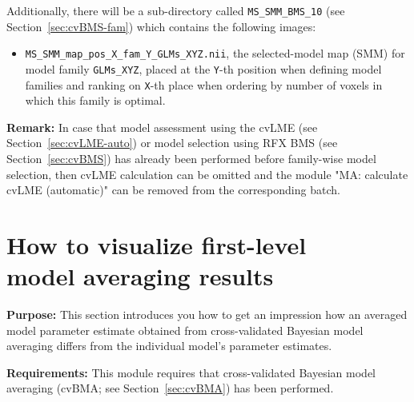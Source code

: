 \documentclass[a4paper,12pt]{article}
\begin{document}
Additionally, there will be a sub-directory called \texttt{MS\_SMM\_BMS\_10} (see Section~\ref{sec:cvBMS-fam}) which contains the following images:
\begin{itemize}
	
\item
\texttt{MS\_SMM\_map\_pos\_X\_fam\_Y\_GLMs\_XYZ.nii}, the selected-model map (SMM) for model family \texttt{GLMs\_XYZ}, placed at the \texttt{Y}-th position when defining model families and ranking on \texttt{X}-th place when ordering by number of voxels in which this family is optimal.
	
\end{itemize}

\textbf{Remark:} In case that model assessment using the cvLME (see Section~\ref{sec:cvLME-auto}) or model selection using RFX BMS (see Section~\ref{sec:cvBMS}) has already been performed before family-wise model selection, then cvLME calculation can be omitted and the module "MA: calculate cvLME (automatic)" can be removed from the corresponding batch.



\pagebreak
{}
\section[How to visualize first-level model averaging results]{How to visualize first-level \\ model averaging results} \label{sec:cvBMA-vis}

\textbf{Purpose:} This section introduces you how to get an impression how an averaged model parameter estimate obtained from cross-validated Bayesian model averaging differs from the individual model's parameter estimates.

\textbf{Requirements:} This module requires that cross-validated Bayesian model averaging (cvBMA; see Section~\ref{sec:cvBMA}) has been performed.
\end{document}
